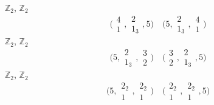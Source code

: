 \documentclass[11pt,a4paper]{article}
\begin{document}
 \quad $\mathbb{Z}_2$, $\mathbb{Z}_2$
\[
  \bigl(\begin{smallmatrix}4\\1\end{smallmatrix}, \begin{smallmatrix}2\\1_3\end{smallmatrix}, 5\bigr) \quad
  \bigl(5, \begin{smallmatrix}2\\1_3\end{smallmatrix}, \begin{smallmatrix}4\\1\end{smallmatrix}\bigr)
\]
 \quad $\mathbb{Z}_2$, $\mathbb{Z}_2$
\[
  \bigl(5, \begin{smallmatrix}2\\1_3\end{smallmatrix}, \begin{smallmatrix}3\\2\end{smallmatrix}\bigr) \quad
  \bigl(\begin{smallmatrix}3\\2\end{smallmatrix}, \begin{smallmatrix}2\\1_3\end{smallmatrix}, 5\bigr)
\]
 \quad $\mathbb{Z}_2$, $\mathbb{Z}_2$
\[
  \bigl(5, \begin{smallmatrix}2_2\\1\end{smallmatrix}, \begin{smallmatrix}2_2\\1\end{smallmatrix}\bigr) \quad
  \bigl(\begin{smallmatrix}2_2\\1\end{smallmatrix}, \begin{smallmatrix}2_2\\1\end{smallmatrix}, 5\bigr)
\]
\end{document}
